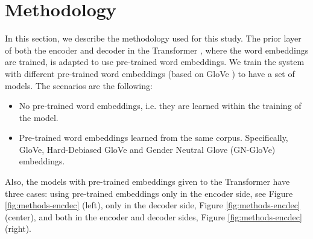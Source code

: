 \documentclass[11pt,a4paper]{article}
\begin{document}
\section{Methodology} %
\label{sec:methods}




In this section, we describe the methodology used for this study. %
The prior layer of both the encoder and decoder in the Transformer \cite{vaswani2017}, where the word embeddings are trained, is adapted to use pre-trained word embeddings. We train the system with different pre-trained word embeddings (based on GloVe \cite{pennington2014}) to have a set of models. The scenarios are the following:

\begin{itemize}
    \item No pre-trained word embeddings, i.e. they are learned within the training of the model.
    \item Pre-trained word embeddings learned from the same corpus. Specifically, GloVe, Hard-Debiased GloVe and Gender Neutral Glove (GN-GloVe) embeddings.
\end{itemize}


Also, the models with pre-trained embeddings given to the Transformer have three cases: using pre-trained embeddings only in the encoder side, see Figure \ref{fig:methods-encdec} (left), only in the decoder side, Figure \ref{fig:methods-encdec} (center), and both in the encoder and decoder sides, Figure \ref{fig:methods-encdec} (right).
\end{document}
